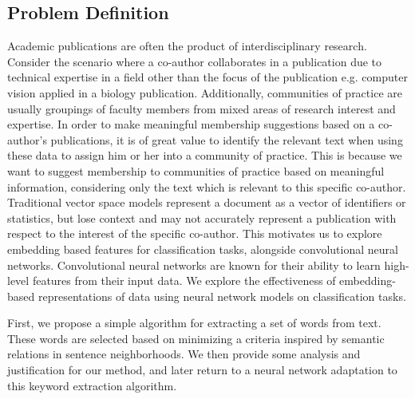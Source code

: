 \documentclass[12pt]{article}
\begin{document}
\subsection{Problem Definition}
Academic publications are often the product of interdisciplinary research. Consider the scenario where a co-author collaborates
in a publication due to technical expertise in a field other than the focus of the publication e.g. computer vision applied in a biology publication.
Additionally, communities of practice are usually groupings of faculty members from mixed areas of research interest and expertise.
In order to make meaningful membership suggestions based on a co-author's publications, it is of great value to identify the relevant text when
using these data to assign him or her into a community of practice.
This is because we want to suggest membership to communities of practice based on meaningful information, considering only the text
which is relevant to this specific co-author. Traditional vector space models represent a document as a vector of identifiers or statistics,
but lose context and may not accurately represent a publication with respect to the interest of the specific co-author.
This motivates us to explore embedding based features for classification tasks, alongside convolutional neural networks.
Convolutional neural networks are known for their ability to learn high-level features from their input data.
We explore the effectiveness of embedding-based representations of data using neural network models on classification tasks.

First, we propose a simple algorithm for extracting a set of words from text. These words are selected based on minimizing a criteria inspired by semantic
relations in sentence neighborhoods. We then provide some analysis and justification for our method, and later return to a neural network adaptation to
this keyword extraction algorithm.
\end{document}

